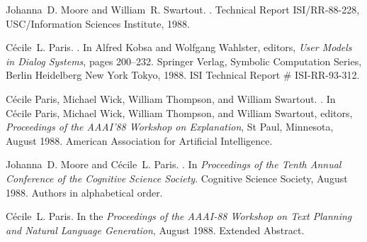 \begin{thebibliography}{10}
\noindent\hspace*{\itemindent}{\leftskip=0.1in\rightskip=0.1in\hrulefill}

Johanna~D. Moore and William~R. Swartout.
.
\newblock Technical Report ISI/RR-88-228, USC/Information Sciences Institute,
  1988.

\noindent\hspace*{\itemindent}{\leftskip=0.1in\rightskip=0.1in\hrulefill}

C\'{e}cile~L. Paris.
.
\newblock In Alfred Kobsa and Wolfgang Wahlster, editors, {\em User Models in
  Dialog Systems}, pages 200--232. Springer Verlag, Symbolic Computation
  Series, Berlin Heidelberg New York Tokyo, 1988.
\newblock ISI Technical Report \# ISI-RR-93-312.

\noindent\hspace*{\itemindent}{\leftskip=0.1in\rightskip=0.1in\hrulefill}

C{\'e}cile Paris, Michael Wick, William Thompson, and William Swartout.
.
\newblock In C{\'e}cile Paris, Michael Wick, William Thompson, and William
  Swartout, editors, {\em {Proceedings of the AAAI'88 Workshop on
  Explanation}}, St Paul, Minnesota, August 1988. American Association for
  Artificial Intelligence.

\noindent\hspace*{\itemindent}{\leftskip=0.1in\rightskip=0.1in\hrulefill}

Johanna~D. Moore and C\'{e}cile~L. Paris.
.
\newblock In {\em Proceedings of the Tenth Annual Conference of the Cognitive
  Science Society}. Cognitive Science Society, August 1988.
\newblock Authors in alphabetical order.

\noindent\hspace*{\itemindent}{\leftskip=0.1in\rightskip=0.1in\hrulefill}

C\'{e}cile~L. Paris.
\newblock In the {\it Proceedings of the AAAI-88 Workshop on Text Planning and
  Natural Language Generation\/}, August 1988.
\newblock Extended Abstract.


\end{thebibliography}
